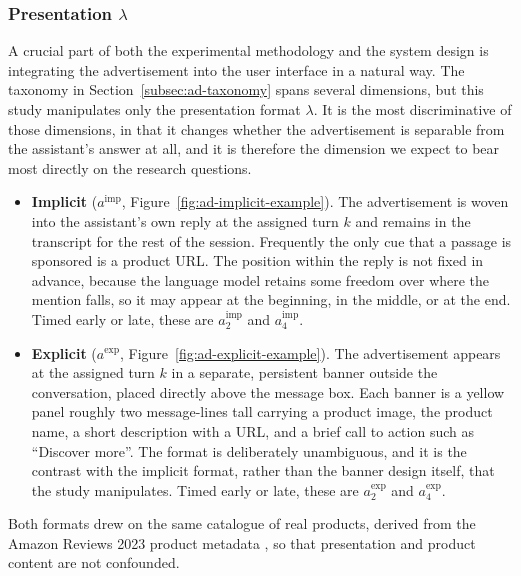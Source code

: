 \documentclass[english]{article}
\begin{document}
\subsubsection{Presentation $\lambda$}

A crucial part of both the experimental methodology and the system design is integrating the advertisement into the user interface in a natural way. The taxonomy in Section~\ref{subsec:ad-taxonomy} spans several dimensions, but this study manipulates only the presentation format \(\lambda\). It is the most discriminative of those dimensions, in that it changes whether the advertisement is separable from the assistant's answer at all, and it is therefore the dimension we expect to bear most directly on the research questions.

\begin{itemize}
    \item \textbf{Implicit} (\(a^{\mathrm{imp}}\), Figure~\ref{fig:ad-implicit-example}). The advertisement is woven into the assistant's own reply at the assigned turn \(k\) and remains in the transcript for the rest of the session. Frequently the only cue that a passage is sponsored is a product URL. The position within the reply is not fixed in advance, because the language model retains some freedom over where the mention falls, so it may appear at the beginning, in the middle, or at the end. Timed early or late, these are \(a^{\mathrm{imp}}_2\) and \(a^{\mathrm{imp}}_4\).
    \item \textbf{Explicit} (\(a^{\mathrm{exp}}\), Figure~\ref{fig:ad-explicit-example}). The advertisement appears at the assigned turn \(k\) in a separate, persistent banner outside the conversation, placed directly above the message box. Each banner is a yellow panel roughly two message-lines tall carrying a product image, the product name, a short description with a URL, and a brief call to action such as ``Discover more''. The format is deliberately unambiguous, and it is the contrast with the implicit format, rather than the banner design itself, that the study manipulates. Timed early or late, these are \(a^{\mathrm{exp}}_2\) and \(a^{\mathrm{exp}}_4\).
\end{itemize}

Both formats drew on the same catalogue of real products, derived from the Amazon Reviews 2023 product metadata \cite{amazon2023reviews,hou2024bridging}, so that presentation and product content are not confounded.
\end{document}
